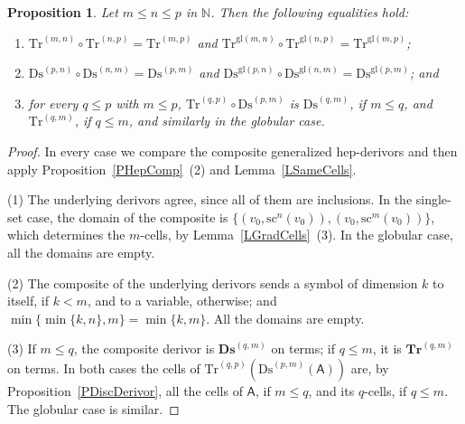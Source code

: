 \documentclass[a4paper,reqno]{amsart}
\newcommand{\calg}[1]{\boldsymbol{\mathsf{#1}}}  %
\newcommand{\gl}{\mathrm{gl}}
\newcommand{\src}{\mathrm{sc}}
\newcommand{\Ds}{\mathrm{Ds}}
\newcommand{\Tr}{\mathrm{Tr}}
\newcommand{\bDs}{\mathbf{Ds}}
\newcommand{\bTr}{\mathbf{Tr}}
\theoremstyle{plain}
\newtheorem{proposition}[theorem]{Proposition}
\theoremstyle{definition}
\begin{document}
\begin{proposition}\label{PTruncComp}
Let $m\leq n\leq p$ in $\mathbb{N}$.
Then the following equalities hold:
\begin{enumerate}
\item $\Tr^{(m,n)}\circ\Tr^{(n,p)}=\Tr^{(m,p)}$ and $\Tr^{\gl(m,n)}\circ\Tr^{\gl(n,p)}=\Tr^{\gl(m,p)}$;
\item $\Ds^{(p,n)}\circ\Ds^{(n,m)}=\Ds^{(p,m)}$ and $\Ds^{\gl(p,n)}\circ\Ds^{\gl(n,m)}=\Ds^{\gl(p,m)}$; and
\item for every $q\leq p$ with $m\leq p$, $\Tr^{(q,p)}\circ\Ds^{(p,m)}$ is $\Ds^{(q,m)}$, if $m\leq q$, and $\Tr^{(q,m)}$, if $q\leq m$, and similarly in the globular case.
\end{enumerate}
\end{proposition}
\begin{proof}
In every case we compare the composite generalized hep-derivors and then apply Proposition~\ref{PHepComp}~(2) and Lemma~\ref{LSameCells}.

(1) The underlying derivors agree, since all of them are inclusions.
In the single-set case, the domain of the composite is $\{(v_{0},\src^{n}(v_{0})),(v_{0},\src^{m}(v_{0}))\}$, which determines the $m$-cells, by Lemma~\ref{LGradCells}~(3).
In the globular case, all the domains are empty.

(2) The composite of the underlying derivors sends a symbol of dimension $k$ to itself, if $k<m$, and to a variable, otherwise; and $\min\{\min\{k,n\},m\}=\min\{k,m\}$.
All the domains are empty.

(3) If $m\leq q$, the composite derivor is $\bDs^{(q,m)}$ on terms; if $q\leq m$, it is $\bTr^{(q,m)}$ on terms.
In both cases the cells of $\Tr^{(q,p)}(\Ds^{(p,m)}(\calg{A}))$ are, by Proposition~\ref{PDiscDerivor}, all the cells of $\calg{A}$, if $m\leq q$, and its $q$-cells, if $q\leq m$.
The globular case is similar.
\end{proof}
\end{document}
